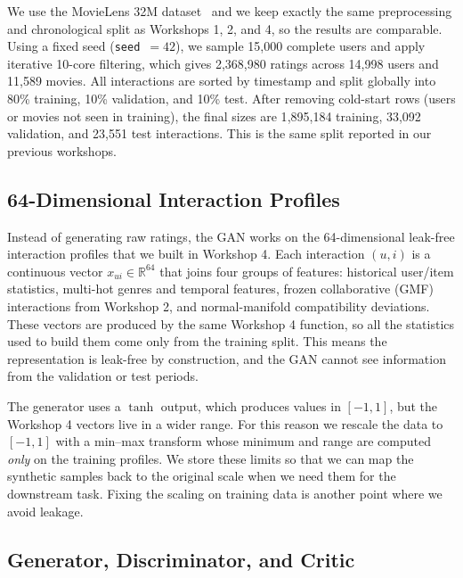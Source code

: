 \documentclass[10pt,twocolumn]{article}
\begin{document}
We use the MovieLens 32M dataset~\cite{harper2015} and we keep exactly the same preprocessing
and chronological split as Workshops 1, 2, and 4, so the results are comparable. Using a fixed
seed (\texttt{seed}~$=42$), we sample 15{,}000 complete users and apply iterative 10-core
filtering, which gives 2{,}368{,}980 ratings across 14{,}998 users and 11{,}589 movies. All
interactions are sorted by timestamp and split globally into 80\% training, 10\% validation,
and 10\% test. After removing cold-start rows (users or movies not seen in training), the final
sizes are 1{,}895{,}184 training, 33{,}092 validation, and 23{,}551 test interactions. This is
the same split reported in our previous workshops.

\subsection{64-Dimensional Interaction Profiles}

Instead of generating raw ratings, the GAN works on the 64-dimensional leak-free interaction
profiles that we built in Workshop 4. Each interaction $(u,i)$ is a continuous vector
$x_{ui}\in\mathbb{R}^{64}$ that joins four groups of features: historical user/item statistics,
multi-hot genres and temporal features, frozen collaborative (GMF) interactions from Workshop 2,
and normal-manifold compatibility deviations. These vectors are produced by the same Workshop 4
function, so all the statistics used to build them come only from the training split. This means
the representation is leak-free by construction, and the GAN cannot see information from the
validation or test periods.

The generator uses a $\tanh$ output, which produces values in $[-1,1]$, but the Workshop 4
vectors live in a wider range. For this reason we rescale the data to $[-1,1]$ with a min--max
transform whose minimum and range are computed \emph{only} on the training profiles. We store
these limits so that we can map the synthetic samples back to the original scale when we need
them for the downstream task. Fixing the scaling on training data is another point where we
avoid leakage.

\subsection{Generator, Discriminator, and Critic}
\end{document}
